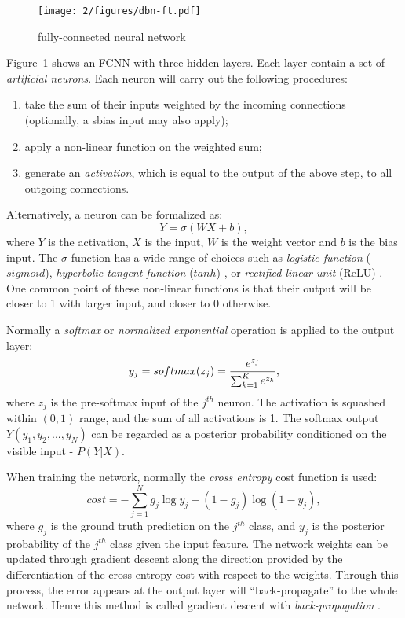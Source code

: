 \begin{figure}[htb]
\centering
\texttt{[image: 2/figures/dbn-ft.pdf]}
\caption{fully-connected neural network}
\label{fig:2-dbn-ft}
\end{figure}
Figure~\ref{fig:2-dbn-ft} shows an FCNN with three hidden layers. Each layer contain a set of {\it artificial neurons}. Each neuron will carry out the following procedures:
\begin{enumerate}
\item take the sum of their inputs weighted by the incoming connections (optionally, a sbias input may also apply);
\item apply a non-linear function on the weighted sum;
\item generate an {\it activation}, which is equal to the output of the above step, to all outgoing connections.
\end{enumerate}
Alternatively, a neuron can be formalized as:
\begin{equation}
Y = \sigma(WX+b),
\end{equation}
where $Y$ is the activation, $X$ is the input, $W$ is the weight vector and $b$ is the bias input. The $\sigma$ function has a wide range of choices \cite{sigtia2014improved} such as {\it logistic function} ($sigmoid$), {\it hyperbolic tangent function} ($tanh$) \cite{lecun2012efficient}, or {\it rectified linear unit} (ReLU) \cite{hahnloser2000digital}. One common point of these non-linear functions is that their output will be closer to 1 with larger input, and closer to 0 otherwise.

Normally a {\it softmax} or {\it normalized exponential} operation is applied to the output layer:
\begin{equation}
y_j = softmax(z_j)={e^{z_j} \over \sum_{k=1}^K e^{z_k}},
\end{equation}
where $z_j$ is the pre-softmax input of the $j^{th}$ neuron. The activation is squashed within $(0,1)$ range, and the sum of all activations is 1. The softmax output $Y(y_1,y_2,...,y_N)$ can be regarded as a posterior probability conditioned on the visible input - $P(Y|X)$.

When training the network, normally the {\it cross entropy} cost function \cite{murphy2012machine} is used:
\begin{equation}\label{eq:2-crossentropy}
cost = -\sum_{j=1}^N g_j\log y_j + (1-g_j)\log(1-y_j),
\end{equation}
where $g_j$ is the ground truth prediction on the $j^{th}$ class, and $y_j$ is the posterior probability of the $j^{th}$ class given the input feature. The network weights can be updated through gradient descent along the direction provided by the differentiation of the cross entropy cost with respect to the weights. Through this process, the error appears at the output layer will ``back-propagate'' to the whole network. Hence this method is called gradient descent with {\it back-propagation} \cite{rumelhart1988learning}.

